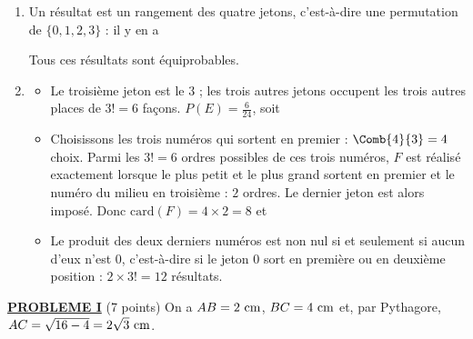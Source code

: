 \begin{description}
\begin{enumerate}
		\item {}
			Un résultat est un rangement des quatre jetons, c'est-à-dire une permutation de $\{0,1,2,3\}$ :
			il y en a \par\noindent{}
			Tous ces résultats sont équiprobables.
		\item
		\begin{itemize}
			\item {}
				Le troisième jeton est le $3$ ; les trois autres jetons occupent les trois autres places de $3! = 6$ façons.
				$P(E) = \frac{6}{24}$, soit \par\noindent{}
			\item {}
				Choisissons les trois numéros qui sortent en premier : $\Comb{4}{3} = 4$ choix.
				Parmi les $3! = 6$ ordres possibles de ces trois numéros, $F$ est réalisé exactement lorsque le plus petit et le plus grand
				sortent en premier et le numéro du milieu en troisième : $2$ ordres. Le dernier jeton est alors imposé.
				Donc $\mathrm{card}(F) = 4 \times 2 = 8$ et \par\noindent{}
			\item {}
				Le produit des deux derniers numéros est non nul si et seulement si aucun d'eux n'est $0$,
				c'est-à-dire si le jeton $0$ sort en première ou en deuxième position : $2 \times 3! = 12$ résultats.
				\par\noindent{}
		\end{itemize}
	\end{enumerate}
\end{description}
\noindent \underline{\textsc{\textbf{PROBLEME I}}} (7 points) \newline
On a $AB = 2~\mathrm{cm}$, $BC = 4~\mathrm{cm}$ et, par Pythagore, $AC = \sqrt{16 - 4} = 2\sqrt{3}~\mathrm{cm}$.
